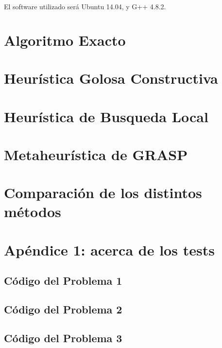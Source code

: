 \documentclass[a4paper]{article}
\begin{document}
El software utilizado será Ubuntu 14.04, y G++ 4.8.2.

\vspace*{0.6cm}
\section{Algoritmo Exacto}


\newpage
\section{Heurística Golosa Constructiva}


\newpage
\section{Heurística de Busqueda Local}


\newpage
\section{Metaheurística de GRASP}


\newpage
\section{Comparación de los distintos métodos}


\newpage
\section{Apéndice 1: acerca de los tests}


\subsection{Código del Problema 1}

\subsection{Código del Problema 2}



\subsection{Código del Problema 3}
\end{document}
